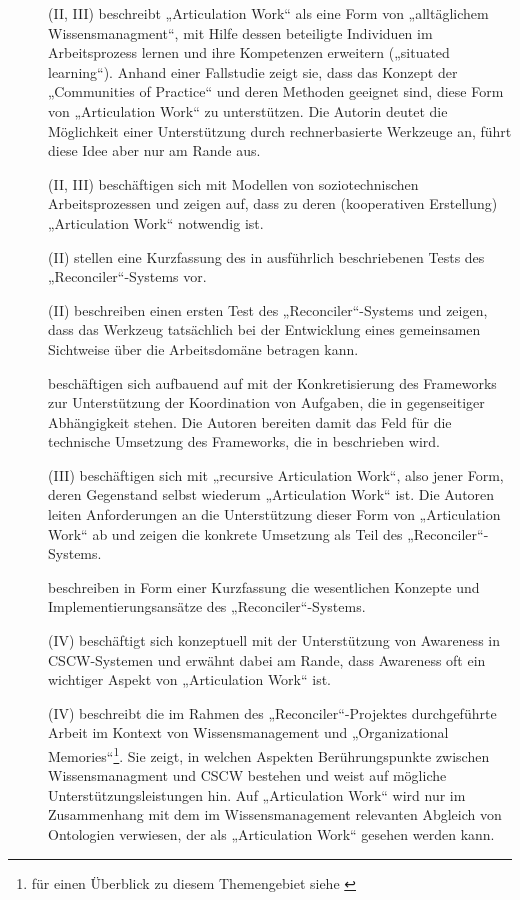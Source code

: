 \begin{description}
	\item[\citet{Davenport02}] (II, III) beschreibt „Articulation Work“ als eine Form von „alltäglichem Wissensmanagment“, mit Hilfe dessen beteiligte Individuen im Arbeitsprozess lernen und ihre Kompetenzen erweitern („situated learning“). Anhand einer Fallstudie zeigt sie, dass das Konzept der „Communities of Practice“ \citep{Wenger98} und deren Methoden geeignet sind, diese Form von „Articulation Work“ zu unterstützen. Die Autorin deutet die Möglichkeit einer Unterstützung durch rechnerbasierte Werkzeuge an, führt diese Idee aber nur am Rande aus.
	\item[\citet{Herrmann02}] (II, III) beschäftigen sich mit Modellen von soziotechnischen Arbeitsprozessen und zeigen auf, dass zu deren (kooperativen Erstellung) „Articulation Work“ notwendig ist. 
	\item[\citet{Mark02}] (II) stellen eine Kurzfassung des in \citep{Mark02a} ausführlich beschriebenen Tests des „Reconciler“-Systems vor.
	\item[\citet{Mark02a}] (II) beschreiben einen ersten Test des „Reconciler“-Systems und zeigen, dass das Werkzeug tatsächlich bei der Entwicklung eines gemeinsamen Sichtweise über die Arbeitsdomäne betragen kann.
	\item[\citet{Raposo02}] beschäftigen sich aufbauend auf \citep{Raposo01} mit der Konkretisierung des Frameworks zur Unterstützung der Koordination von Aufgaben, die in gegenseitiger Abhängigkeit stehen. Die Autoren bereiten damit das Feld für die technische Umsetzung des Frameworks, die in \citep{Raposo04} beschrieben wird.
	\item[\citet{Sarini02}] (III) beschäftigen sich mit „recursive Articulation Work“, also jener Form, deren Gegenstand selbst wiederum „Articulation Work“ ist. Die Autoren leiten Anforderungen an die Unterstützung dieser Form von „Articulation Work“ ab und zeigen die konkrete Umsetzung als Teil des „Reconciler“-Systems.
	\item[\citet{Sarini02a}] beschreiben in Form einer Kurzfassung die wesentlichen Konzepte und Implementierungsansätze des „Reconciler“-Systems.
	\item[\citet{Schmidt02}] (IV) beschäftigt sich konzeptuell mit der Unterstützung von Awareness in \gls{CSCW}-Systemen und erwähnt dabei am Rande, dass Awareness oft ein wichtiger Aspekt von „Articulation Work“ ist.
	\item[\citet{Simone02}] (IV) beschreibt die im Rahmen des „Reconciler“-Projektes durchgeführte Arbeit im Kontext von Wissensmanagement und „Organizational Memories“\footnote{für einen Überblick zu diesem Themengebiet siehe \citep{Maier08}}. Sie zeigt, in welchen Aspekten Berührungspunkte zwischen Wissensmanagment und \gls{CSCW} bestehen und weist auf mögliche Unterstützungsleistungen hin. Auf „Articulation Work“ wird nur im Zusammenhang mit dem im Wissensmanagement relevanten Abgleich von Ontologien verwiesen, der als „Articulation Work“ gesehen werden kann.

\end{description}
